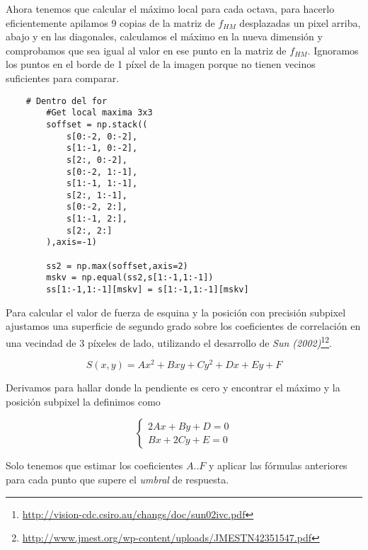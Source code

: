 \documentclass{article}
\begin{document}
Ahora tenemos que calcular el máximo local para cada octava, para hacerlo eficientemente apilamos 9 copias de la matriz de $f_{HM}$ desplazadas un pixel arriba, abajo y en las diagonales, calculamos el máximo en la nueva dimensión y comprobamos que sea igual al valor en ese punto en la matriz de $f_{HM}$. Ignoramos los puntos en el borde de 1 píxel de la imagen porque no tienen vecinos suficientes para comparar.

\begin{lstlisting}
    # Dentro del for
        #Get local maxima 3x3
        soffset = np.stack((
            s[0:-2, 0:-2],
            s[1:-1, 0:-2],
            s[2:, 0:-2],
            s[0:-2, 1:-1],
            s[1:-1, 1:-1],
            s[2:, 1:-1],
            s[0:-2, 2:],
            s[1:-1, 2:],
            s[2:, 2:]
        ),axis=-1)
		
        ss2 = np.max(soffset,axis=2)
        mskv = np.equal(ss2,s[1:-1,1:-1])
        ss[1:-1,1:-1][mskv] = s[1:-1,1:-1][mskv]
\end{lstlisting}

Para calcular el valor de fuerza de esquina y la posición con precisión subpixel ajustamos una superficie de segundo grado sobre los coeficientes de correlación en una vecindad de 3 píxeles de lado, utilizando el desarrollo de \textit{Sun (2002)}\footnote{\url{http://vision-cdc.csiro.au/changs/doc/sun02ivc.pdf}}\footnote{\url{http://www.jmest.org/wp-content/uploads/JMESTN42351547.pdf}}.

\[ S(x,y) = Ax^2+Bxy+Cy^2+Dx+Ey+F \]

Derivamos para hallar donde la pendiente es cero y encontrar el máximo  y la posición subpixel la definimos como

\[\left\{\begin{matrix}
2Ax + By+D=0\\ 
Bx+2Cy+E=0
\end{matrix}\right.\]

Solo tenemos que estimar los coeficientes $A..F$ y aplicar las fórmulas anteriores para cada punto que supere el \textit{umbral }de respuesta.
\end{document}
